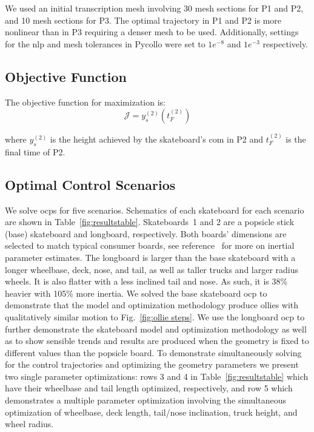 \documentclass[default,iicol,pdflatex]{sn-jnl}
\begin{document}
We used an initial transcription mesh involving 30 mesh sections for P1 and P2, and 10 mesh sections for P3. The optimal trajectory in P1 and P2 is more nonlinear than in P3 requiring a denser mesh to be used.
Additionally, settings for the \gls{nlp} and mesh tolerances in Pycollo were set to $1e^{-8}$ and $1e^{-3}$ respectively.

\subsection{Objective Function}

The objective function for maximization is:
%
\begin{equation}
  \mathcal{J} = y_s^{(2)}\left(t_F^{(2)}\right)
\end{equation}

\noindent where $y_s^{(2)}$ is the height achieved by the skateboard's \gls{com} in P2 and $t_F^{(2)}$ is the final time of P2.

\subsection{Optimal Control Scenarios}
%
We solve \glspl{ocp} for five scenarios. Schematics of each skateboard for each scenario are shown in Table~\ref{fig:resultstable}. Skateboards~1 and 2 are a popsicle stick (base) skateboard and longboard, respectively. Both boards' dimensions are selected to match typical consumer boards, see reference~\cite{heinen_optimal_2022} for more on inertial parameter estimates. 
The longboard is larger than the base skateboard with a longer wheelbase, deck, nose, and tail, as well as taller trucks and larger radius wheels. It is also flatter with a less inclined tail and nose. As such, it is 38\% heavier with 105\% more inertia.
We solved the base skateboard \gls{ocp} to demonstrate that the model and optimization methodology produce ollies with qualitatively similar motion to Fig.~\ref{fig:ollie steps}.
We use the longboard \gls{ocp} to further demonstrate the skateboard model and optimization methodology as well as to show sensible trends and results are produced when the geometry is fixed to different values than the popsicle board.
To demonstrate simultaneously solving for the control trajectories and optimizing the geometry parameters we present two single parameter optimizations: rows 3 and 4 in Table~\ref{fig:resultstable} which have their wheelbase and tail length optimized, respectively, and row 5 which demonstrates a multiple parameter optimization involving the simultaneous optimization of wheelbase, deck length, tail/nose inclination, truck height, and wheel radius.
\end{document}
